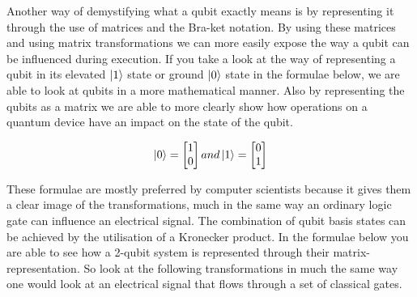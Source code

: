 Another way of demystifying what a qubit exactly means is by representing it through the use of matrices and the Bra-ket notation. By using these matrices and using matrix transformations we can more easily expose the way a qubit can be influenced during execution. 
If you take a look at the way of representing a qubit in its elevated $\ket{1}$ state or ground $\ket{0}$ state in the formulae below, we are able to look at qubits in a more mathematical manner. Also by representing the qubits as a matrix we are able to more clearly show how operations on a quantum device have an impact on the state of the qubit.


\[
	\ket{0}=
	\begin{bmatrix}
	1					\\
	0
	\end{bmatrix} 
	and
	\ket{1}=
	\begin{bmatrix}
	0					\\
	1
	\end{bmatrix} 
\]

These formulae are mostly preferred by computer scientists because it gives them a clear image of the transformations, much in the same way an ordinary logic gate can influence an electrical signal. The combination of qubit basis states can be achieved by the utilisation of a Kronecker product. In the formulae below you are able to see how a 2-qubit system is represented through their matrix-representation. So look at the following transformations in much the same way one would look at an electrical signal that flows through a set of classical gates.

